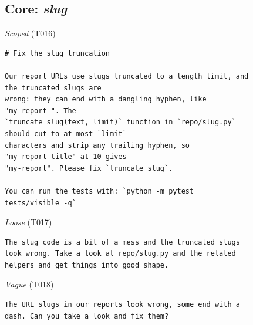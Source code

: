 \subsection*{Core: \emph{slug}}
\noindent\textit{Scoped} (T016)
\begin{Verbatim}[fontsize=\scriptsize,frame=leftline,xleftmargin=0.5em]
# Fix the slug truncation

Our report URLs use slugs truncated to a length limit, and
the truncated slugs are
wrong: they can end with a dangling hyphen, like
"my-report-". The
`truncate_slug(text, limit)` function in `repo/slug.py`
should cut to at most `limit`
characters and strip any trailing hyphen, so
"my-report-title" at 10 gives
"my-report". Please fix `truncate_slug`.

You can run the tests with: `python -m pytest
tests/visible -q`
\end{Verbatim}

\noindent\textit{Loose} (T017)
\begin{Verbatim}[fontsize=\scriptsize,frame=leftline,xleftmargin=0.5em]
The slug code is a bit of a mess and the truncated slugs
look wrong. Take a look at repo/slug.py and the related
helpers and get things into good shape.
\end{Verbatim}

\noindent\textit{Vague} (T018)
\begin{Verbatim}[fontsize=\scriptsize,frame=leftline,xleftmargin=0.5em]
The URL slugs in our reports look wrong, some end with a
dash. Can you take a look and fix them?
\end{Verbatim}

